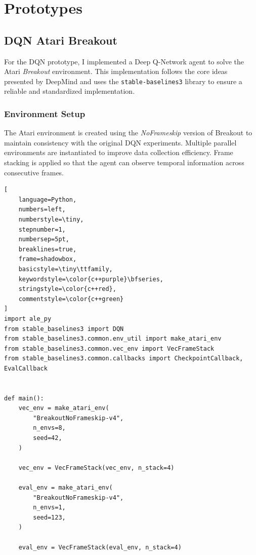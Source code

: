 
\chapter{Prototypes} %

\ifpdf
    \graphicspath{{3_chapter3/figures/PNG/}{3_chapter3/figures/PDF/}{3_chapter3/figures/}}
\else
    \graphicspath{{3_chapter3/figures/EPS/}{3_chapter3/figures/}}
\fi


\section{DQN Atari Breakout}
    
    For the DQN prototype, I implemented a Deep Q-Network agent to solve the Atari \textit{Breakout} environment. This implementation follows the core ideas presented by DeepMind and uses the \texttt{stable-baselines3} library to ensure a reliable and standardized implementation.


\newpage
\subsection{Environment Setup}
    
    The Atari environment is created using the \textit{NoFrameskip} version of Breakout to maintain consistency with the original DQN experiments. Multiple parallel environments are instantiated to improve data collection efficiency. Frame stacking is applied so that the agent can observe temporal information across consecutive frames.
    
 \begin{lstlisting}[
    language=Python,
    numbers=left,
    numberstyle=\tiny,
    stepnumber=1,
    numbersep=5pt,
    breaklines=true,
    frame=shadowbox,
    basicstyle=\tiny\ttfamily,
    keywordstyle=\color{c++purple}\bfseries,
    stringstyle=\color{c++red},
    commentstyle=\color{c++green}
]
import ale_py
from stable_baselines3 import DQN
from stable_baselines3.common.env_util import make_atari_env
from stable_baselines3.common.vec_env import VecFrameStack
from stable_baselines3.common.callbacks import CheckpointCallback, EvalCallback


def main():
    vec_env = make_atari_env(
        "BreakoutNoFrameskip-v4",
        n_envs=8,
        seed=42,
    )

    vec_env = VecFrameStack(vec_env, n_stack=4)

    eval_env = make_atari_env(
        "BreakoutNoFrameskip-v4",
        n_envs=1,
        seed=123,
    )

    eval_env = VecFrameStack(eval_env, n_stack=4)
\end{lstlisting}

